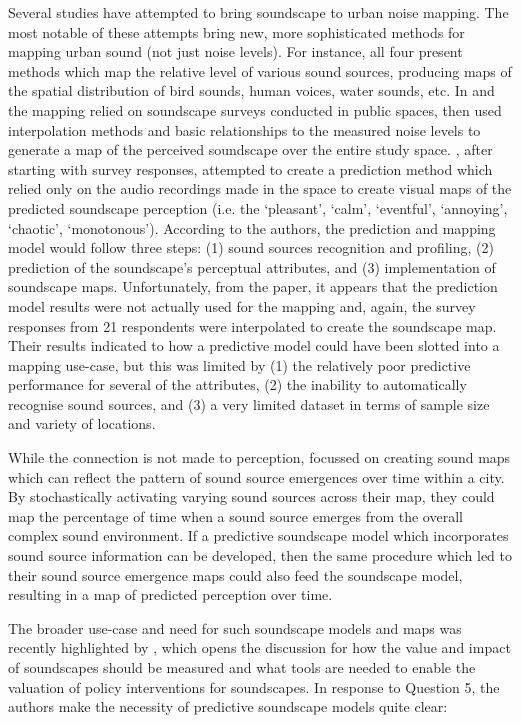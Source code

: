 Several studies have attempted to bring soundscape to urban noise mapping. The most notable of these attempts \citep{Aletta2015Soundscape,Hong2017Exploring,Aumond2018Probabilistic,Kang2018model} bring new, more sophisticated methods for mapping urban sound (not just noise levels). For instance, all four present methods which map the relative level of various sound sources, producing maps of the spatial distribution of bird sounds, human voices, water sounds, etc. In \citet{Aletta2015Soundscape} and \citet{Hong2017Exploring} the mapping relied on soundscape surveys conducted in public spaces, then used interpolation methods and basic relationships to the measured noise levels to generate a map of the perceived soundscape over the entire study space. \citet{Kang2018model}, after starting with survey responses, attempted to create a prediction method which relied only on the audio recordings made in the space to create visual maps of the predicted soundscape perception (i.e. the  `pleasant', `calm', `eventful', `annoying', `chaotic', `monotonous'). According to the authors, the prediction and mapping model would follow three steps: (1) sound sources recognition and profiling, (2) prediction of the soundscape's perceptual attributes, and (3) implementation of soundscape maps. Unfortunately, from the paper, it appears that the prediction model results were not actually used for the mapping and, again, the survey responses from 21 respondents were interpolated to create the soundscape map. Their results indicated to how a predictive model could have been slotted into a mapping use-case, but this was limited by (1) the relatively poor predictive performance for several of the attributes, (2) the inability to automatically recognise sound sources, and (3) a very limited dataset in terms of sample size and variety of locations.

While the connection is not made to perception, \citet{Aumond2018Probabilistic} focussed on creating sound maps which can reflect the pattern of sound source emergences over time within a city. By stochastically activating varying sound sources across their map, they could map the percentage of time when a sound source emerges from the overall complex sound environment. If a predictive soundscape model which incorporates sound source information can be developed, then the same procedure which led to their sound source emergence maps could also feed the soundscape model, resulting in a map of predicted perception over time. 

The broader use-case and need for such soundscape models and maps was recently highlighted by \citet{Jiang2022Ten}, which opens the discussion for how the value and impact of soundscapes should be measured and what tools are needed to enable the valuation of policy interventions for soundscapes. In response to Question 5, the authors make the necessity of predictive soundscape models quite clear:


